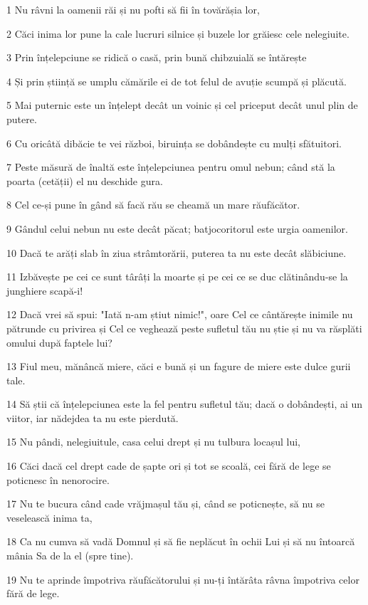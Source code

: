 \par 1 Nu râvni la oamenii răi și nu pofti să fii în tovărășia lor,
\par 2 Căci inima lor pune la cale lucruri silnice și buzele lor grăiesc cele nelegiuite.
\par 3 Prin înțelepciune se ridică o casă, prin bună chibzuială se întărește
\par 4 Și prin știință se umplu cămările ei de tot felul de avuție scumpă și plăcută.
\par 5 Mai puternic este un înțelept decât un voinic și cel priceput decât unul plin de putere.
\par 6 Cu oricâtă dibăcie te vei război, biruința se dobândește cu mulți sfătuitori.
\par 7 Peste măsură de înaltă este înțelepciunea pentru omul nebun; când stă la poarta (cetății) el nu deschide gura.
\par 8 Cel ce-și pune în gând să facă rău se cheamă un mare răufăcător.
\par 9 Gândul celui nebun nu este decât păcat; batjocoritorul este urgia oamenilor.
\par 10 Dacă te arăți slab în ziua strâmtorării, puterea ta nu este decât slăbiciune.
\par 11 Izbăvește pe cei ce sunt târâți la moarte și pe cei ce se duc clătinându-se la junghiere scapă-i!
\par 12 Dacă vrei să spui: "Iată n-am știut nimic!", oare Cel ce cântărește inimile nu pătrunde cu privirea și Cel ce veghează peste sufletul tău nu știe și nu va răsplăti omului după faptele lui?
\par 13 Fiul meu, mănâncă miere, căci e bună și un fagure de miere este dulce gurii tale.
\par 14 Să știi că înțelepciunea este la fel pentru sufletul tău; dacă o dobândești, ai un viitor, iar nădejdea ta nu este pierdută.
\par 15 Nu pândi, nelegiuitule, casa celui drept și nu tulbura locașul lui,
\par 16 Căci dacă cel drept cade de șapte ori și tot se scoală, cei fără de lege se poticnesc în nenorocire.
\par 17 Nu te bucura când cade vrăjmașul tău și, când se poticnește, să nu se veselească inima ta,
\par 18 Ca nu cumva să vadă Domnul și să fie neplăcut în ochii Lui și să nu întoarcă mânia Sa de la el (spre tine).
\par 19 Nu te aprinde împotriva răufăcătorului și nu-ți întărâta râvna împotriva celor fără de lege.
